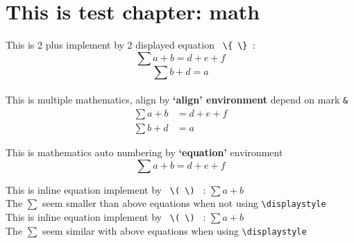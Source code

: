 \documentclass[12pt, a4paper, twoside]{report}
\begin{document}
\chapter{This is test chapter: math}

This is 2 plus implement by 2 displayed equation \verb` \{ \} `:
\[
\sum a+b = d + e + f
\]
\[
\sum b+d = a
\] \\

This is multiple mathematics, align by \textbf{`align' environment} depend on mark \verb|&|
\begin{align}
    \sum a+b &= d + e + f \label{eq: no1}  \\
    \sum b+d &= a \label{eq: no2}
\end{align}

This is mathematics auto numbering by \textbf{`equation'} environment
\begin{equation}
    \sum a+b = d + e + f \label{eq: no3}
\end{equation}

This is inline equation implement by \verb^ \( \) ^ : $ \sum a+b $ \\
\hspace{1cm}The $\sum$ seem smaller than above equations when not using \verb!\displaystyle! \\

This is inline equation implement by \verb^ \( \) ^ : $ \displaystyle  \sum a+b $ \\
\hspace{1cm}The $\sum$ seem similar with above equations when using \verb!\displaystyle! \\
\end{document}

